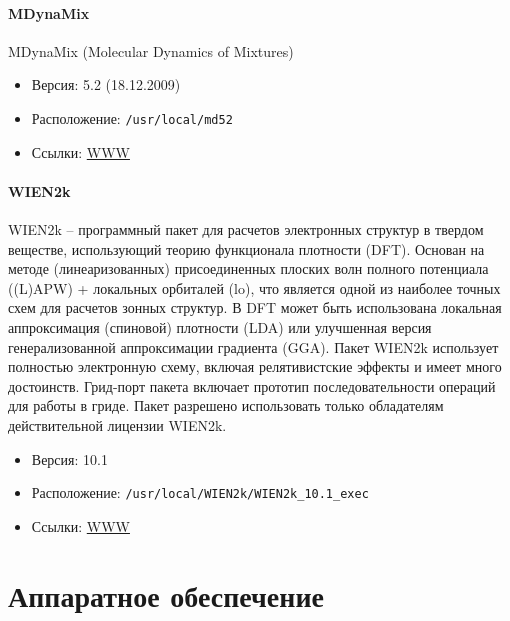 \documentclass[a4paper,8pt]{extreport}
\newcounter{ex}
\begin{document}
\subsubsection{MDynaMix}
MDynaMix (Molecular Dynamics of Mixtures)
\begin{itemize}
 \item Версия: 5.2 (18.12.2009)
 \item Расположение: \verb|/usr/local/md52|
 \item Ссылки: \href{http://www.fos.su.se/~sasha/mdynamix/}{WWW}
\end{itemize}

\subsubsection{WIEN2k}
WIEN2k – программный пакет для расчетов электронных структур в твердом веществе, использующий теорию
функционала плотности (DFT). Основан на методе (линеаризованных) присоединенных плоских волн полного
потенциала ((L)APW) + локальных орбиталей (lo), что является одной из наиболее точных схем для расчетов
зонных структур. В DFT может быть использована локальная аппроксимация (спиновой) плотности (LDA) или
улучшенная версия генерализованной аппроксимации градиента (GGA). Пакет WIEN2k использует полностью
электронную схему, включая релятивистские эффекты и имеет много достоинств. Грид-порт пакета включает
прототип последовательности операций для работы в гриде. Пакет разрешено использовать только обладателям
действительной лицензии WIEN2k.
\begin{itemize}
 \item Версия: 10.1
 \item Расположение: \verb|/usr/local/WIEN2k/WIEN2k_10.1_exec|
 \item Ссылки: \href{http://www.wien2k.at/}{WWW}
\end{itemize}


\chapter{Аппаратное обеспечение}
\end{document}
